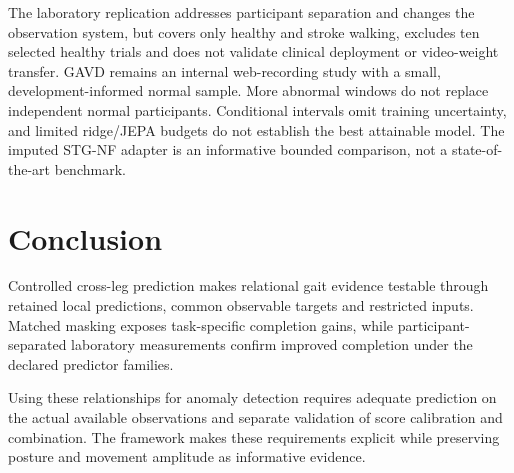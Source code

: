 \documentclass[letterpaper]{article}
\begin{document}
The laboratory replication addresses participant separation and changes the observation system, but covers only healthy and stroke walking, excludes ten selected healthy trials and does not validate clinical deployment or video-weight transfer. GAVD remains an internal web-recording study with a small, development-informed normal sample. More abnormal windows do not replace independent normal participants. Conditional intervals omit training uncertainty, and limited ridge/JEPA budgets do not establish the best attainable model. The imputed STG-NF adapter is an informative bounded comparison, not a state-of-the-art benchmark.

\section{Conclusion}

Controlled cross-leg prediction makes relational gait evidence testable through retained local predictions, common observable targets and restricted inputs. Matched masking exposes task-specific completion gains, while participant-separated laboratory measurements confirm improved completion under the declared predictor families.

Using these relationships for anomaly detection requires adequate prediction on the actual available observations and separate validation of score calibration and combination. The framework makes these requirements explicit while preserving posture and movement amplitude as informative evidence.

\end{document}
